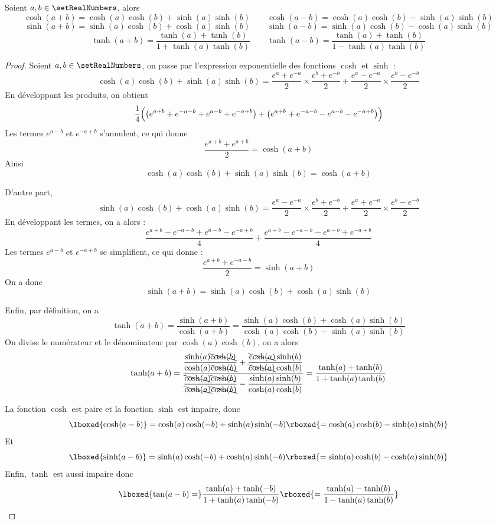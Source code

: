 
\begin{theorem}
\label{trigonometrie:hyperbolique:addition}
Soient $a, b \in \setRealNumbers$, alors
\[
\cosh(a+b)=\cosh(a)\cosh(b) + \sinh(a)\sinh(b)
\qquad
\cosh(a-b)=\cosh(a)\cosh(b) - \sinh(a)\sinh(b)
\]
\[
\sinh(a+b)=\sinh(a)\cosh(b) + \cosh(a)\sinh(b)
\qquad
\sinh(a-b)=\sinh(a)\cosh(b) - \cosh(a)\sinh(b)
\]
\[
\tanh(a+b)=\dfrac{\tanh(a)+\tanh(b)}{1+\tanh(a)\tanh(b)}
\qquad 
\tanh(a-b)=\dfrac{\tanh(a)+\tanh(b)}{1-\tanh(a)\tanh(b)}
\]
\end{theorem}

\begin{proof}
Soient $a, b \in \setRealNumbers$, on passe par l'expression exponentielle des fonctions $\cosh$ et $\sinh$ :
\[
\cosh(a)\cosh(b) + \sinh(a)\sinh(b)
= \dfrac{e^{a}+e^{-a}}{2} \times \dfrac{e^{b}+e^{-b}}{2}+\dfrac{e^{a}-e^{-a}}{2} \times \dfrac{e^{b}-e^{-b}}{2}
\]
En développant les produits, on obtient 
\[
\dfrac{1}{4}\Bigl(\left(e^{a+b}+e^{-a-b} + e^{a-b}+e^{-a+b}\right) + \left(e^{a+b}+e^{-a-b}-e^{a-b}-e^{-a+b}\right)\Bigr)
\]
Les termes $e^{a-b}$ et $e^{-a+b}$ s'annulent, ce qui donne
\[
\dfrac{e^{a+b} + e^{a+b}}{2} = \cosh(a+b)
\]
Ainsi 
\[
\cosh(a)\cosh(b) + \sinh(a)\sinh(b)
=\cosh(a+b)
\]

D'autre part, 
\[
\sinh(a)\cosh(b) + \cosh(a)\sinh(b)
= \dfrac{e^{a}-e^{-a}}{2} \times \dfrac{e^{b}+e^{-b}}{2}+\dfrac{e^{a}+e^{-a}}{2} \times\dfrac{e^{b}-e^{-b}}{2}
\]
En développant les termes, on a alors : 
\[
\dfrac{e^{a+b}-e^{-a-b}+e^{a-b}-e^{-a+b}}{4}+\dfrac{e^{a+b}-e^{-a-b}-e^{a-b}+e^{-a+b}}{4}
\]
Les termes $e^{a-b}$ et $e^{-a+b}$ se simplifient, ce qui donne :
\[
\dfrac{e^{a+b} + e^{-a-b}}{2}= \sinh(a+b)
\]
On a donc
\[
\sinh(a+b) = \sinh(a)\cosh(b) + \cosh(a)\sinh(b)
\]

Enfin, par définition, on a 
\[
\tanh(a+b)=\dfrac{\sinh(a+b)}{\cosh(a+b)}=\dfrac{\sinh(a)\cosh(b) + \cosh(a)\sinh(b)}{\cosh(a)\cosh(b) - \sinh(a)\sinh(b)}
\]
On divise le numérateur et le dénominateur par $\cosh(a)\cosh(b)$, on a alors 
\[
\tanh(a+b)=\dfrac{\dfrac{\sinh(a)\bcancel{\cosh(b)}}{\cosh(a)\bcancel{\cosh(b)}} + \dfrac{\bcancel{\cosh(a)}\sinh(b)}{\bcancel{\cosh(a)}\cosh(b)}}{\dfrac{\bcancel{\cosh(a)}\bcancel{\cosh(b)}}{\bcancel{\cosh(a)}\bcancel{\cosh(b)}} - \dfrac{\sinh(a)\sinh(b)}{\cosh(a)\cosh(b)}}
=\dfrac{\tanh(a)+\tanh(b)}{1+\tanh(a)\tanh(b)}
\]

La fonction $\cosh$ est paire et la fonction $\sinh$ est impaire, donc 
\[
\lboxed{\cosh(a-b)}=\cosh(a)\cosh(-b) + \sinh(a)\sinh(-b)\rboxed{=\cosh(a)\cosh(b) - \sinh(a)\sinh(b)}
\]
Et
\[
\lboxed{\sinh(a-b)} = \sinh(a)\cosh(-b) + \cosh(a)\sinh(-b)\rboxed{=\sinh(a)\cosh(b) - \cosh(a)\sinh(b)}
\]
Enfin, $\tanh$ est aussi impaire donc 
\[
\lboxed{\tan(a-b)=}\dfrac{\tanh(a)+\tanh(-b)}{1+\tanh(a)\tanh(-b)}\rboxed{=\dfrac{\tanh(a)-\tanh(b)}{1-\tanh(a)\tanh(b)}}
\]
\end{proof}
